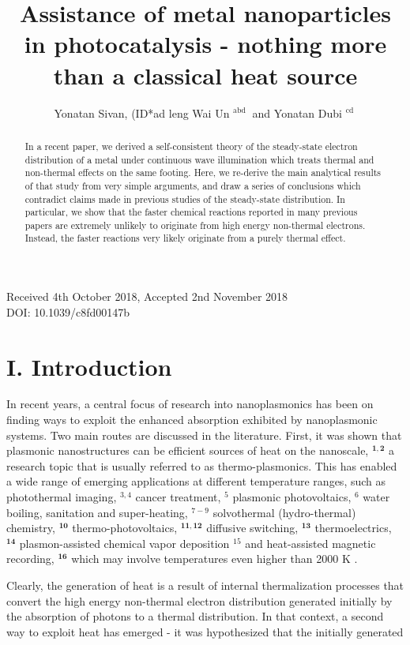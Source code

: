 \documentclass[10pt]{article}
\title{Assistance of metal nanoparticles in photocatalysis - nothing more than a classical heat source }
\author{Yonatan Sivan, (ID*ad leng Wai Un ${ }^{\text {abd }}$ and Yonatan Dubi ${ }^{\text {cd }}$}
\date{}
\begin{document}
\maketitle
\captionsetup{singlelinecheck=false}
Received 4th October 2018, Accepted 2nd November 2018\\
DOI: 10.1039/c8fd00147b

\begin{abstract}
In a recent paper, we derived a self-consistent theory of the steady-state electron distribution of a metal under continuous wave illumination which treats thermal and non-thermal effects on the same footing. Here, we re-derive the main analytical results of that study from very simple arguments, and draw a series of conclusions which contradict claims made in previous studies of the steady-state distribution. In particular, we show that the faster chemical reactions reported in many previous papers are extremely unlikely to originate from high energy non-thermal electrons. Instead, the faster reactions very likely originate from a purely thermal effect.
\end{abstract}

\section*{I. Introduction}
In recent years, a central focus of research into nanoplasmonics has been on finding ways to exploit the enhanced absorption exhibited by nanoplasmonic systems. Two main routes are discussed in the literature. First, it was shown that plasmonic nanostructures can be efficient sources of heat on the nanoscale, ${ }^{\mathbf{1 , 2}}$ a research topic that is usually referred to as thermo-plasmonics. This has enabled a wide range of emerging applications at different temperature ranges, such as photothermal imaging, ${ }^{3,4}$ cancer treatment, ${ }^{5}$ plasmonic photovoltaics, ${ }^{6}$ water boiling, sanitation and super-heating, ${ }^{7-9}$ solvothermal (hydro-thermal) chemistry, ${ }^{\mathbf{1 0}}$ thermo-photovoltaics, ${ }^{\mathbf{1 1 , 1 2}}$ diffusive switching, ${ }^{\mathbf{1 3}}$ thermoelectrics, ${ }^{\mathbf{1 4}}$ plasmon-assisted chemical vapor deposition ${ }^{15}$ and heat-assisted magnetic recording, ${ }^{\mathbf{1 6}}$ which may involve temperatures even higher than 2000 K .

Clearly, the generation of heat is a result of internal thermalization processes that convert the high energy non-thermal electron distribution generated initially by the absorption of photons to a thermal distribution. In that context, a second way to exploit heat has emerged - it was hypothesized that the initially generated
\end{document}
